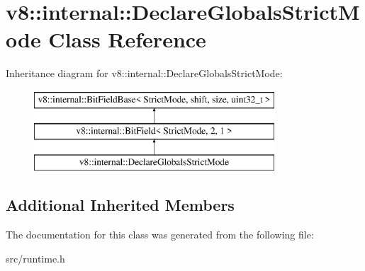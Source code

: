 \hypertarget{classv8_1_1internal_1_1_declare_globals_strict_mode}{}\section{v8\+:\+:internal\+:\+:Declare\+Globals\+Strict\+Mode Class Reference}
\label{classv8_1_1internal_1_1_declare_globals_strict_mode}
Inheritance diagram for v8\+:\+:internal\+:\+:Declare\+Globals\+Strict\+Mode\+:\begin{figure}[H]
\begin{center}
\leavevmode
\includegraphics[height=3.000000cm]{classv8_1_1internal_1_1_declare_globals_strict_mode}
\end{center}
\end{figure}
\subsection*{Additional Inherited Members}


The documentation for this class was generated from the following file\+:\begin{DoxyCompactItemize}
\item 
src/runtime.\+h\end{DoxyCompactItemize}

